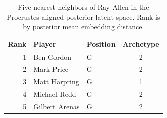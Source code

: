 \begin{table}[htbp]
  \centering\small
  \begin{tabular}{rllc}
    \toprule
    Rank & Player & Position & Archetype \\
    \midrule
    1 & Ben Gordon & G & 2 \\
    2 & Mark Price & G & 2 \\
    3 & Matt Harpring & G & 1 \\
    4 & Michael Redd & G & 2 \\
    5 & Gilbert Arenas & G & 2 \\
    \bottomrule
  \end{tabular}
  \caption{Five nearest neighbors of Ray Allen in the Procrustes-aligned posterior latent space. Rank is by posterior mean embedding distance.}
  \label{tab:Ray_Allen_neighbors}
\end{table}

